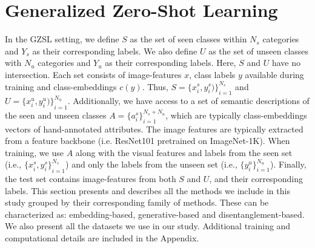 \vspace{-0.05in}
\section{Generalized Zero-Shot Learning}

In the GZSL setting, we define $S$ as the set of seen classes within $N_s$ categories and $Y_s$ as their corresponding labels. We also define $U$ as the set of unseen classes with $N_u$ categories and $Y_u$ as their corresponding labels. Here, $S$ and $U$ have no intersection. 
Each set consists of image-features $x$, class labels $y$ available during training and class-embeddings $c(y)$. 
Thus, $S = \{ {x_{i}^{s}, y_{i}^{s}) \} }^{N_{s}}_{i=1}$ and $U = \{ {x_{i}^{u}, y_{i}^{u}) \} }^{N_{u}}_{i=1}$. 
Additionally, we have access to a set of semantic descriptions of the seen and unseen classes $A = \{ {a_{i}^{s} \} }^{N_{s} + N_{u} }_{i=1}$, which are typically class-embeddings vectors of hand-annotated  attributes. The image features are typically extracted from a feature backbone (i.e. ResNet101 pretrained on ImageNet-1K).
When training, we use $A$ along with the visual features and labels from the seen set (i.e., $ \{ {x_{i}^{s}, y_{i}^{s} \} }^{N_{s}}_{i=1}$) and only the labels from the unseen set (i.e., $ \{ y_{i}^{u} \} ^{N_{u}}_{i=1}$). Finally, the test set contains image-features from both $S$ and $U$, and their corresponding labels.
This section presents and describes all the methods we include in this study grouped by their corresponding family of methods. These can be characterized as: embedding-based, generative-based and disentanglement-based. We also present all the datasets we use in our study. Additional training and computational details are included in the Appendix.

